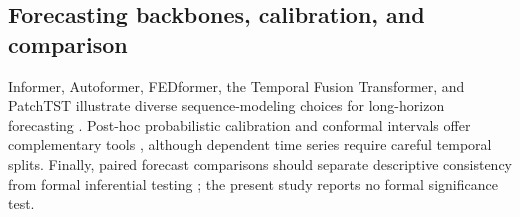 \subsection{Forecasting backbones, calibration, and comparison}
Informer, Autoformer, FEDformer, the Temporal Fusion Transformer, and PatchTST illustrate diverse sequence-modeling choices for long-horizon forecasting \citep{zhou2021informer,wu2021autoformer,zhou2022fedformer,lim2021tft,nie2023patchtst}. Post-hoc probabilistic calibration and conformal intervals offer complementary tools \citep{kuleshov2018calibrated,romano2019cqr,stankeviciute2021conformal}, although dependent time series require careful temporal splits. Finally, paired forecast comparisons should separate descriptive consistency from formal inferential testing \citep{diebold1995comparison,giacomini2006conditional}; the present study reports no formal significance test.

